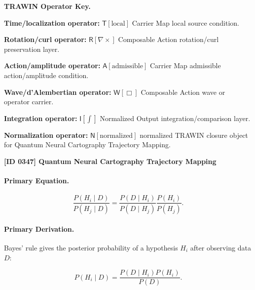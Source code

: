\par\vspace{0.45\baselineskip}
\noindent\begin{minipage}[t]{\linewidth}
\begingroup
\small
\raggedright
\textbf{TRAWIN Operator Key.}\par
\noindent\textbf{Time/localization operator:} $\mathsf{T}\!\left[\mathrm{local}\right]$ Carrier Map local source condition.\par
\noindent\textbf{Rotation/curl operator:} $\mathsf{R}\!\left[\nabla\times\right]$ Composable Action rotation/curl preservation layer.\par
\noindent\textbf{Action/amplitude operator:} $\mathsf{A}\!\left[\mathrm{admissible}\right]$ Carrier Map admissible action/amplitude condition.\par
\noindent\textbf{Wave/d'Alembertian operator:} $\mathsf{W}\!\left[\Box\right]$ Composable Action wave or operator carrier.\par
\noindent\textbf{Integration operator:} $\mathsf{I}\!\left[\int\right]$ Normalized Output integration/comparison layer.\par
\noindent\textbf{Normalization operator:} $\mathsf{N}\!\left[\mathrm{normalized}\right]$ normalized TRAWIN closure object for Quantum Neural Cartography Trajectory Mapping.\par
\endgroup
\end{minipage}

\clearpage
\noindent\textbf{[ID 0347] Quantum Neural Cartography Trajectory Mapping}\par
\vspace{0.35em}
\paragraph{Primary Equation.}
\begin{equation}
\frac{P(H_i\mid D)}
{P(H_j\mid D)}
=
\frac{P(D\mid H_i)}
{P(D\mid H_j)}
\frac{P(H_i)}
{P(H_j)} .
\end{equation}

\paragraph{Primary Derivation.}
Bayes' rule gives the posterior probability of a hypothesis $H_i$ after observing data $D$:

\begin{equation}
P(H_i\mid D)
=
\frac{P(D\mid H_i)P(H_i)}
{P(D)} .
\end{equation}

